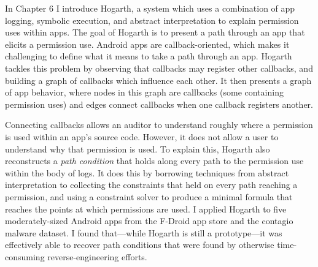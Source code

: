 In Chapter 6 I introduce Hogarth, a system which uses a combination of
app logging, symbolic execution, and abstract interpretation to
explain permission uses within apps. The goal of Hogarth is to present
a path through an app that elicits a permission use. Android apps are
callback-oriented, which makes it challenging to define what it means
to take a path through an app. Hogarth tackles this problem by
observing that callbacks may register other callbacks, and building a
graph of callbacks which influence each other. It then presents a
graph of app behavior, where nodes in this graph are callbacks (some
containing permission uses) and edges connect callbacks when one
callback registers another.

Connecting callbacks allows an auditor to understand roughly where a
permission is used within an app's source code. However, it does not
allow a user to understand why that permission is used. To explain
this, Hogarth also reconstructs a \emph{path condition} that holds
along every path to the permission use within the body of logs. It
does this by borrowing techniques from abstract interpretation to
collecting the constraints that held on every path reaching a
permission, and using a constraint solver to produce a minimal formula
that reaches the points at which permissions are used. I applied
Hogarth to five moderately-sized Android apps from the F-Droid app
store and the contagio malware dataset. I found that---while Hogarth
is still a prototype---it was effectively able to recover path
conditions that were found by otherwise time-consuming
reverse-engineering efforts.


